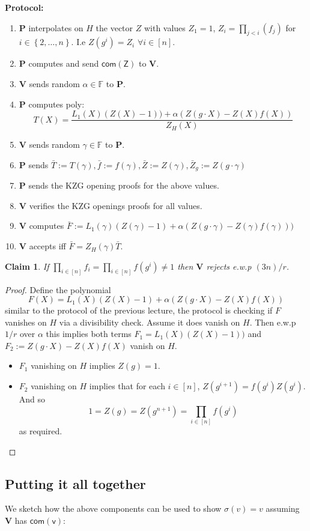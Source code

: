 \documentclass[11pt]{article} %
\newcommand{\F}{\ensuremath{\mathbb F}\xspace}
\newcommand{\com}[1]{\ensuremath{\mathsf{com(#1)}}\xspace}
\newcommand{\defeq}{:=}
\newcommand{\prv}{\ensuremath{\mathsf{\mathbf{P}}}\xspace}
\newcommand{\ver}{\ensuremath{\mathsf{\mathbf{V}}}\xspace}
\newcommand{\set}[1]{\ensuremath{\left\{#1\right\}}\xspace}
\newtheorem{claim}[lemma]{Claim}
\begin{document}
\textbf{Protocol:}
\begin{enumerate}
 \item \prv interpolates on $H$ the vector $Z$ with values 
 $Z_1=1$, $Z_i=\prod_{j<i} (f_j)$ for $i\in \set{2,\ldots,n}$.
 I.e $Z(g^i) = Z_i$ $\forall i\in [n]$.
 \item \prv computes and send $\com{Z}$ to \ver.
 \item \ver sends random $\alpha\in \F$ to \prv.
 \item \prv computes poly:
 \[T(X)=\frac{L_1(X)(Z(X)-1)) + \alpha(Z(g\cdot X)-Z(X)f(X))}{Z_H(X)}\]
 \item \ver sends random $\gamma \in \F$ to \prv. 
 \item \prv sends $\bar{T}\defeq T(\gamma),\bar{f}\defeq f(\gamma),\bar{Z}\defeq Z(\gamma),\bar{Z}_{g}\defeq Z(g\cdot \gamma)$
 \item \prv sends the KZG opening proofs for the above values.
 \item \ver verifies the KZG openings proofs for all values.
 \item \ver computes $\bar{F}\defeq    L_1(\gamma)(Z(\gamma)-1) + \alpha(Z(g\cdot\gamma)-Z(\gamma)f(\gamma)))$
 \item \ver accepts iff $\bar{F}=Z_H(\gamma)\bar{T}$.
\end{enumerate}

\begin{claim}
 If $\prod_{i\in [n]}f_i =  \prod_{i\in [n]}f(g^i)\neq 1$ then \ver rejects e.w.p $(3n)/r$.
\end{claim}
\begin{proof}
 Define the polynomial 
 \[F(X)=L_1(X)(Z(X)-1) + \alpha(Z(g\cdot X)-Z(X)f(X))\]
 similar to the protocol of the previous lecture, the protocol is checking if $F$ vanishes on $H$ via a divisibility check.
 Assume it does vanish on $H$.
 Then e.w.p $1/r$ over $\alpha$ this implies both terms  $F_1=L_1(X)(Z(X)-1))$ and $F_2\defeq Z(g\cdot X)-Z(X)f(X)$ vanish on $H$.
 
 \begin{itemize}
  \item $F_1$ vanishing on $H$ implies $Z(g)=1$.
  \item $F_2$ vanishing on $H$ implies that for each $i\in [n]$, $Z(g^{i+1})=f(g^i)Z(g^i)$. And so 
  \[1=Z(g)= Z(g^{n+1})=\prod_{i\in [n]} f(g^i)\] 
 as required.
 \end{itemize}

 
\end{proof}
\subsection{Putting it all together}
We sketch how the above components can be used to show $\sigma(v)=v$ assuming \ver has $\com{v}$:
\end{document}

